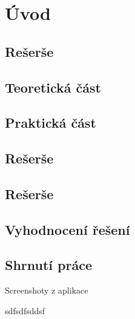 \chapter{Úvod}

\section{Rešerše}

\section{Teoretická část}

\section{Praktická část}

\section{Rešerše}

\section{Rešerše}


\section{Vyhodnocení řešení}



\section{Shrnutí práce}



Screenshoty z aplikace

sdfsdfsddsf \cite{szeliski_2011} \cite{nixon_2012} \cite{parker_2011} \cite{tatroe_2013} \cite{FM_prirucka_Pliva}